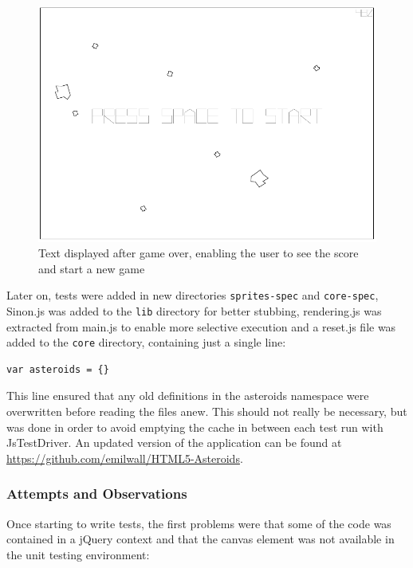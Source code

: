\documentclass[11pt]{article}
\begin{document}
\begin{figure}[h!]
\centering
\includegraphics[width=1.0\textwidth]{pics/game6.png}
\caption{Text displayed after game over, enabling the user to see the score and start a new game}
\label{fig:game6}
\end{figure}

Later on, tests were added in new directories \texttt{sprites-spec} and \texttt{core-spec}, Sinon.js was added to the \texttt{lib} directory for better stubbing, rendering.js was extracted from main.js to enable more selective execution and a reset.js file was added to the \texttt{core} directory, containing just a single line:

\begin{verbatim}
var asteroids = {}
\end{verbatim}

This line ensured that any old definitions in the asteroids namespace were overwritten before reading the files anew. This should not really be necessary, but was done in order to avoid emptying the cache in between each test run with JsTestDriver. An updated version of the application can be found at \url{https://github.com/emilwall/HTML5-Asteroids}.

\subsubsection{Attempts and Observations}
\label{ssubsec:attemptsandobservations}

Once starting to write tests, the first problems were that some of the code was contained in a jQuery context and that the canvas element was not available in the unit testing environment:
\end{document}
